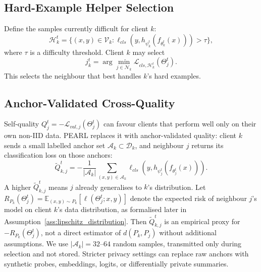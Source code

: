 \documentclass[conference]{IEEEtran}
\begin{document}
\subsection{Hard-Example Helper Selection}
\label{subsec:hard-example-helper-selection}
Define the samples currently difficult for client \(k\):
\begin{equation*}
    \mathcal{H}_k^t
    =
    \{(x,y)\in\mathcal{V}_k:
    \ell_{cls}(y,h_{\psi_k^t}(f_{\theta_k^t}(x)))>\tau\},
\end{equation*}
where \(\tau\) is a difficulty threshold. Client \(k\) may select
\begin{equation*}
    j_k^t
    =
    \arg\min_{j\in\mathcal{N}_k}
    \mathcal{L}_{cls,\mathcal{H}_k^t}(\Theta_j^t).
\end{equation*}
This selects the neighbour that best handles \(k\)'s hard examples.

\subsection{Anchor-Validated Cross-Quality}
\label{subsec:anchor-validated-cross-quality}
Self-quality \(Q_j^t=-\mathcal{L}_{val,j}(\Theta_j^t)\) can favour clients that perform well only on their own non-IID data. PEARL replaces it with anchor-validated quality: client \(k\) sends a small labelled anchor set \(\mathcal{A}_k\subset\mathcal{D}_k\), and neighbour \(j\) returns its classification loss on those anchors:
\begin{equation}
    \tilde{Q}_{k,j}^{t}
    =
    -\frac{1}{|\mathcal{A}_k|}
    \sum_{(x,y)\in\mathcal{A}_k}
    \ell_{cls}(y, h_{\psi_j^t}(f_{\theta_j^t}(x))).
    \label{eq:anchor_quality}
\end{equation}
A higher \(\tilde{Q}_{k,j}^t\) means \(j\) already generalises to \(k\)'s distribution. Let \(R_{P_k}(\Theta_j^t)=\mathbb{E}_{(x,y)\sim P_k}[\ell(\Theta_j^t;x,y)]\) denote the expected risk of neighbour \(j\)'s model on client \(k\)'s data distribution, as formalised later in Assumption~\ref{ass:lipschitz_distribution}. Then \(\tilde{Q}_{k,j}^t\) is an empirical proxy for \(-R_{P_k}(\Theta_j^t)\), not a direct estimator of \(d(P_k,P_j)\) without additional assumptions. We use \(|\mathcal{A}_k|=32\)--\(64\) random samples, transmitted only during selection and not stored. Stricter privacy settings can replace raw anchors with synthetic probes, embeddings, logits, or differentially private summaries.
\end{document}
